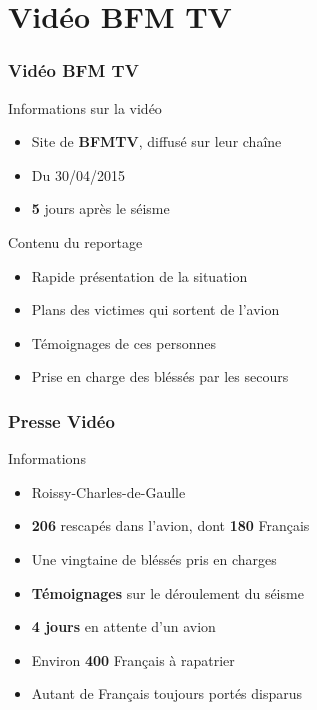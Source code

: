 \section{Vidéo BFM TV}
\begin{frame}
\frametitle{Vidéo BFM TV}
  \begin{block}{Informations sur la vidéo}
    \begin{itemize}
      \item{Site de \textbf{BFMTV}, diffusé sur leur chaîne}
      \item{Du 30/04/2015}
      \item{\textbf{5} jours après le séisme}
    \end{itemize}
  \end{block} \pause
  
  \begin{block}{Contenu du reportage}
    \begin{itemize}
      \item{Rapide présentation de la situation}
      \item{Plans des victimes qui sortent de l'avion}
      \item{Témoignages de ces personnes}
      \item{Prise en charge des bléssés par les secours}
    \end{itemize}
  \end{block}
\end{frame}

\begin{frame}
\frametitle{Presse Vidéo}
  \begin{block}{Informations}
    \begin{itemize}
      \item{Roissy-Charles-de-Gaulle}
      \item{\textbf{206} rescapés dans l'avion, dont \textbf{180} Français}
      \item{Une vingtaine de bléssés pris en charges} \pause
      \item{\textbf{Témoignages} sur le déroulement du séisme}
      \item{\textbf{4 jours} en attente d'un avion} \pause
      \item{Environ \textbf{400} Français à rapatrier}
      \item{Autant de Français toujours portés disparus}
    \end{itemize}
  \end{block}
\end{frame}
